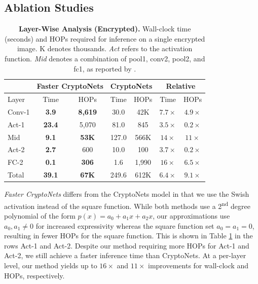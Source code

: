 \documentclass[conference]{IEEEtran}
\begin{document}
\subsection{Ablation Studies}\label{sec:ablation}


\begin{table}[!htbp]
    \centering
    \footnotesize
    \begin{tabular}{@{}l|cc|cc|cc@{}}
    \toprule
     & \multicolumn{2}{c|}{Faster CryptoNets} & \multicolumn{2}{c|}{CryptoNets} & \multicolumn{2}{c}{Relative} \\ \midrule
    Layer & Time & HOPs & Time & HOPs & Time & HOPs \\
    \midrule
    Conv-1 & \textbf{3.9} & \textbf{8,619} & 30.0 & 42K& $7.7 \times$ & $4.9\times$ \\
    Act-1 & \textbf{23.4} & 5,070 & 81.0 & 845 & $3.5 \times$ & $0.2 \times$ \\
    Mid & \textbf{9.1} & \textbf{53K} & 127.0 & 566K & $14 \times$ & $11 \times$ \\
    Act-2 & \textbf{2.7} & 600 & 10.0 & 100 & $3.7 \times$ & $0.2\times$ \\
    FC-2 & \textbf{0.1} & \textbf{306} & 1.6 & 1,990 & $16\times$ & $6.5\times$ \\ \midrule
    Total & \textbf{39.1} & \textbf{67K} & 249.6 & 612K & $6.4 \times$ & $9.1\times$ \\ \bottomrule
    \end{tabular}
    \caption{\textbf{Layer-Wise Analysis (Encrypted).} Wall-clock time (seconds) and HOPs required for inference on a single encrypted image. K denotes thousands. \textit{Act} refers to the activation function. \textit{Mid} denotes a combination of pool1, conv2, pool2, and fc1, as reported by \cite{gilad2016cryptonets}. %
    }
        \vskip -0.1in
    \label{table:layerwise}
\end{table}



\textit{Faster CryptoNets} differs from the CryptoNets model in that we use the Swish activation instead of the square function.
While both methods use a 2\textsuperscript{nd} degree polynomial of the form $p(x) = a_0 + a_1 x + a_2 x$, our approximations use $a_0, a_1 \neq 0$ for increased expressivity whereas the square function set $a_0 = a_1 = 0$, resulting in fewer HOPs for the square function.
This is shown in Table \ref{table:layerwise} in the rows Act-1 and Act-2.
Despite our method requiring more HOPs for Act-1 and Act-2, we still achieve a faster inference time than CryptoNets.
At a per-layer level, our method yields up to $16\times$ and $11 \times$ improvements for wall-clock and HOPs, respectively.
\end{document}

